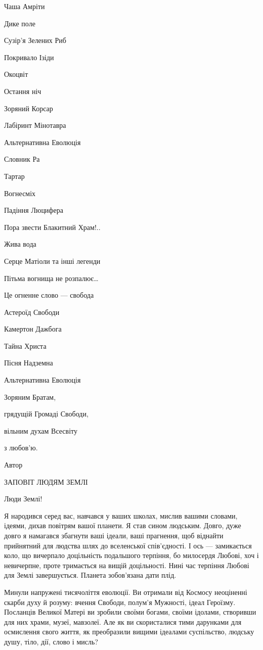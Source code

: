 Чаша Амріти

Дике поле

Сузір’я Зелених Риб

Покривало Ізіди

Окоцвіт

Остання ніч

Зоряний Корсар

Лабіринт Мінотавра

Альтернативна Еволюція

Словник Ра

Тартар

Вогнесміх

Падіння Люцифера

Пора звести Блакитний Храм!..

Жива вода

Серце Матіоли та інші легенди

Пітьма вогнища не розпалює…

Це огненне слово — свобода

Астероїд Свободи

Камертон Дажбога

Тайна Христа

Пісня Надземна

Альтернативна Еволюція

Зоряним Братам,

грядущій Громаді Свободи,

вільним духам Всесвіту

з любов’ю.

Автор

ЗАПОВІТ ЛЮДЯМ ЗЕМЛІ

Люди Землі!

Я народився серед вас, навчався у ваших школах, мислив вашими словами, ідеями,
дихав повітрям вашої планети. Я став сином людським. Довго, дуже довго я
намагався збагнути ваші ідеали, ваші прагнення, щоб віднайти прийнятний для
людства шлях до вселенської спів’єдності. І ось — замикається коло, що
вичерпало доцільність подальшого терпіння, бо милосердя Любові, хоч і
невичерпне, проте тримається на вищій доцільності. Нині час терпіння Любові для
Землі завершується. Планета зобов’язана дати плід.

Минули напружені тисячоліття еволюції. Ви отримали від Космосу неоціненні
скарби духу й розуму: вчення Свободи, полум’я Мужності, ідеал Героїзму.
Посланців Великої Матері ви зробили своїми богами, своїми ідолами, створивши
для них храми, музеї, мавзолеї. Але як ви скористалися тими дарунками для
осмислення свого життя, як преобразили вищими ідеалами суспільство, людську
душу, тіло, дії, слово і мисль?

